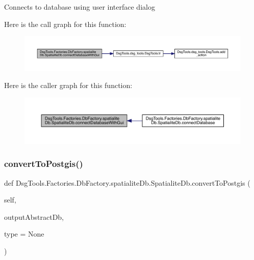 \begin{DoxyVerb}Connects to database using user interface dialog
\end{DoxyVerb}
 Here is the call graph for this function\+:
\nopagebreak
\begin{figure}[H]
\begin{center}
\leavevmode
\includegraphics[width=350pt]{class_dsg_tools_1_1_factories_1_1_db_factory_1_1spatialite_db_1_1_spatialite_db_a8af5d99f30b1196ba398157b2e2d78dc_cgraph}
\end{center}
\end{figure}
Here is the caller graph for this function\+:
\nopagebreak
\begin{figure}[H]
\begin{center}
\leavevmode
\includegraphics[width=350pt]{class_dsg_tools_1_1_factories_1_1_db_factory_1_1spatialite_db_1_1_spatialite_db_a8af5d99f30b1196ba398157b2e2d78dc_icgraph}
\end{center}
\end{figure}
\mbox{\label{class_dsg_tools_1_1_factories_1_1_db_factory_1_1spatialite_db_1_1_spatialite_db_a06dd9cc920f62cd988d92bcedabf5a88}} 
\subsubsection{\texorpdfstring{convert\+To\+Postgis()}{convertToPostgis()}}
{\footnotesize\ttfamily def Dsg\+Tools.\+Factories.\+Db\+Factory.\+spatialite\+Db.\+Spatialite\+Db.\+convert\+To\+Postgis (\begin{DoxyParamCaption}\item[{}]{self,  }\item[{}]{output\+Abstract\+Db,  }\item[{}]{type = {\ttfamily None} }\end{DoxyParamCaption})}

